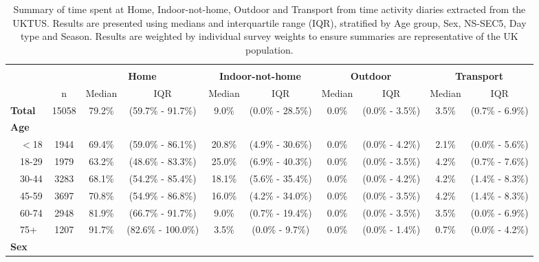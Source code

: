 \documentclass{article}
\begin{document}
\begin{landscape}
\begin{table}[ht]
\centering
\caption{Summary of time spent at Home, Indoor-not-home, Outdoor and Transport from time activity diaries extracted from the UKTUS. Results are presented using medians and interquartile range (IQR), stratified by Age group, Sex, NS-SEC5, Day type and Season. Results are weighted by individual survey weights to ensure summaries are representative of the UK population.}\label{tab::summarydailydiaries}
\begin{tabular}{llccccccccc}
  \hline
  \hline\\[-8pt]
   & & & \multicolumn{2}{c}{\textbf{Home}}& \multicolumn{2}{c}{\textbf{Indoor-not-home}} & \multicolumn{2}{c}{\textbf{Outdoor}} & \multicolumn{2}{c}{\textbf{Transport}}\\
	 \cmidrule(lr){4-5}
	 \cmidrule(lr){6-7}
	 \cmidrule(lr){8-9}
	 \cmidrule(lr){10-11}
   & & n & Median & IQR & Median & IQR & Median & IQR & Median & IQR  \\ 
  \hline
 \multicolumn{2}{l}{\textbf{Total}} & 15058 & 79.2\% & (59.7\% - 91.7\%) & 9.0\% & (0.0\% - 28.5\%) & 0.0\% & (0.0\% - 3.5\%) & 3.5\% & (0.7\% - 6.9\%) \\[3pt] 
 \multicolumn{2}{l}{\textbf{Age}} \\
   & $<$18 & 1944 & 69.4\% & (59.0\% - 86.1\%) & 20.8\% & (4.9\% - 30.6\%) & 0.0\% & (0.0\% - 4.2\%) & 2.1\% & (0.0\% - 5.6\%) \\ 
   & 18-29 & 1979 & 63.2\% & (48.6\% - 83.3\%) & 25.0\% & (6.9\% - 40.3\%) & 0.0\% & (0.0\% - 3.5\%) & 4.2\% & (0.7\% - 7.6\%) \\ 
   & 30-44 & 3283 & 68.1\% & (54.2\% - 85.4\%) & 18.1\% & (5.6\% - 35.4\%) & 0.0\% & (0.0\% - 4.2\%) & 4.2\% & (1.4\% - 8.3\%) \\ 
   & 45-59 & 3697 & 70.8\% & (54.9\% - 86.8\%) & 16.0\% & (4.2\% - 34.0\%) & 0.0\% & (0.0\% - 3.5\%) & 4.2\% & (1.4\% - 8.3\%) \\ 
   & 60-74 & 2948 & 81.9\% & (66.7\% - 91.7\%) & 9.0\% & (0.7\% - 19.4\%) & 0.0\% & (0.0\% - 3.5\%) & 3.5\% & (0.0\% - 6.9\%) \\ 
   & 75+ & 1207 & 91.7\% & (82.6\% - 100.0\%) & 3.5\% & (0.0\% - 9.7\%) & 0.0\% & (0.0\% - 1.4\%) & 0.7\% & (0.0\% - 4.2\%) \\[3pt] 
 \multicolumn{2}{l}{\textbf{Sex}} \\

\end{tabular}
\end{table}
\end{landscape}
\end{document}
